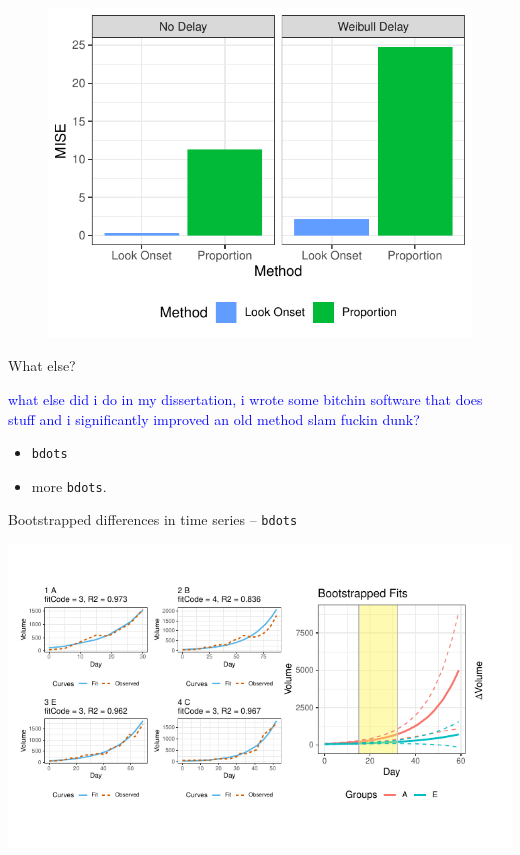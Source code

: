 \documentclass{beamer}
\newcommand{\xt}{\texttt}
\providecommand{\cn}[1]{\textcolor{blue}{#1}}
\begin{document}
\begin{frame}
\begin{figure}
\centering
\includegraphics[scale=1]{mise_bar.pdf}
\end{figure}
\end{frame}

\begin{frame}{What else?}

\cn{what else did i do in  my dissertation, i wrote some bitchin software that does stuff and i significantly improved an old method slam fuckin dunk?}

\begin{itemize}
\item \xt{bdots}
\item more \xt{bdots}.
\end{itemize}
\end{frame}




\begin{frame}{Bootstrapped differences in time series -- \texttt{bdots}}
\vspace{-1mm}
\begin{center}
\includegraphics{bdots_examples.pdf}
\end{center}
\end{frame}
\end{document}

